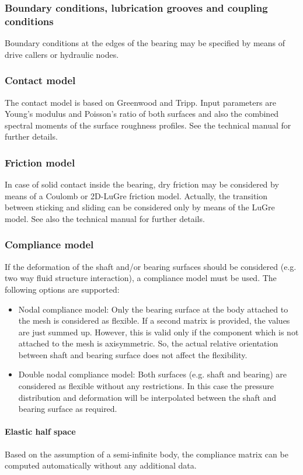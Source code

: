 \subsubsection{Boundary conditions, lubrication grooves and coupling conditions}
Boundary conditions at the edges of the bearing may be specified by means of drive callers or hydraulic nodes.
\subsubsection{Contact model}
The contact model is based on Greenwood and Tripp\cite{Greenwood-1970}. Input parameters are Young's modulus and Poisson's ratio of both surfaces and also the combined spectral moments of the surface roughness profiles. See the technical manual for further details.
\subsubsection{Friction model}
In case of solid contact inside the bearing, dry friction may be considered by means of a Coulomb or 2D-LuGre friction model\cite{LuGre2D}. Actually, the transition between sticking and sliding can be considered only by means of the LuGre model. See also the technical manual for further details.
\subsubsection{Compliance model}
If the deformation of the shaft and/or bearing surfaces should be considered (e.g. two way fluid structure interaction), a compliance model must be used. The following options are supported:
\begin{itemize}
\item{Nodal compliance model:} Only the bearing surface at the body attached to the mesh is considered as flexible. If a second matrix is provided, the values are just summed up. However, this is valid only if the component which is not attached to the mesh is axisymmetric. So, the actual relative orientation between shaft and bearing surface does not affect the flexibility.
\item{Double nodal compliance model:} Both surfaces (e.g. shaft and bearing) are considered as flexible without any restrictions. In this case the pressure distribution and deformation will be interpolated between the shaft and bearing surface as required.
\end{itemize}
\paragraph{Elastic half space}
Based on the assumption of a semi-infinite body, the compliance matrix can be computed automatically without any additional data.
